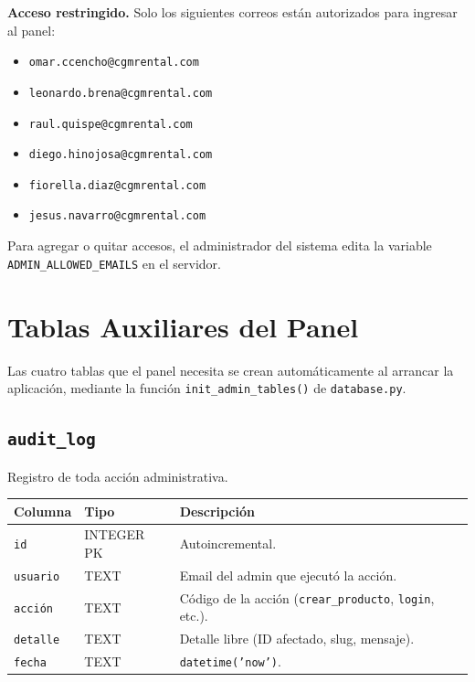 \documentclass[11pt,a4paper]{article}
\begin{document}
\begin{tipbox}
\textbf{Acceso restringido.} Solo los siguientes correos están autorizados
para ingresar al panel:
\begin{itemize}[leftmargin=*,topsep=4pt,itemsep=2pt]
    \item \texttt{omar.ccencho@cgmrental.com}
    \item \texttt{leonardo.brena@cgmrental.com}
    \item \texttt{raul.quispe@cgmrental.com}
    \item \texttt{diego.hinojosa@cgmrental.com}
    \item \texttt{fiorella.diaz@cgmrental.com}
    \item \texttt{jesus.navarro@cgmrental.com}
\end{itemize}
Para agregar o quitar accesos, el administrador del sistema edita la
variable \texttt{ADMIN\_ALLOWED\_EMAILS} en el servidor.
\end{tipbox}

\section{Tablas Auxiliares del Panel}
\label{sec:tablas-admin}

Las cuatro tablas que el panel necesita se crean automáticamente al
arrancar la aplicación, mediante la función \texttt{init\_admin\_tables()}
de \texttt{database.py}.

\subsection{\texttt{audit\_log}}
Registro de toda acción administrativa.

\begin{longtable}{p{3.5cm} p{2cm} p{8cm}}
\toprule
\textbf{Columna} & \textbf{Tipo} & \textbf{Descripción} \\
\midrule
\endhead
\texttt{id}      & INTEGER PK & Autoincremental. \\
\texttt{usuario} & TEXT       & Email del admin que ejecutó la acción. \\
\texttt{acción}  & TEXT       & Código de la acción (\texttt{crear\_producto}, \texttt{login}, etc.). \\
\texttt{detalle} & TEXT       & Detalle libre (ID afectado, slug, mensaje). \\
\texttt{fecha}   & TEXT       & \texttt{datetime('now')}. \\
\bottomrule
\end{longtable}
\end{document}
